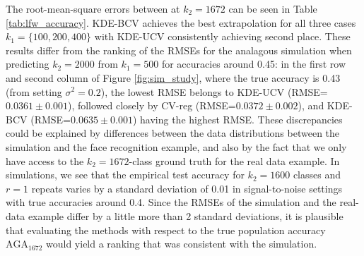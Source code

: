 \documentclass[twoside,11pt]{article}
\begin{document}
The root-mean-square errors between at $k_2=1672$ can be seen in Table
\ref{tab:lfw_accuracy}.  KDE-BCV achieves the best extrapolation for
all three cases $k_1= \{100,200,400\}$ with KDE-UCV consistently
achieving second place.  These results differ from the ranking of the
RMSEs for the analagous simulation when predicting $k_2 = 2000$ from
$k_1 = 500$ for accuracies around 0.45: in the first row and second
column of Figure \ref{fig:sim_study}, where the true accuracy is 0.43
(from setting $\sigma^2=0.2$), the lowest RMSE belongs to KDE-UCV
(RMSE=$0.0361 \pm 0.001$), followed closely by CV-reg (RMSE=$0.0372
\pm 0.002$), and KDE-BCV (RMSE=$0.0635\pm0.001$) having the highest
RMSE.  These discrepancies could be explained by differences between
the data distributions between the simulation and the face recognition
example, and also by the fact that we only have access to the $k_2 =
1672$-class ground truth for the real data example.  In simulations,
we see that the empirical test accuracy for $k_2 = 1600$ classes and
$r=1$ repeats varies by a standard deviation of 0.01 in
signal-to-noise settings with true accuracies around 0.4.  Since the
RMSEs of the simulation and the real-data example differ by a little
more than 2 standard deviations, it is plausible that evaluating the
methods with respect to the true population accuracy
$\text{AGA}_{1672}$ would yield a ranking that was consistent with the
simulation.
\end{document}
